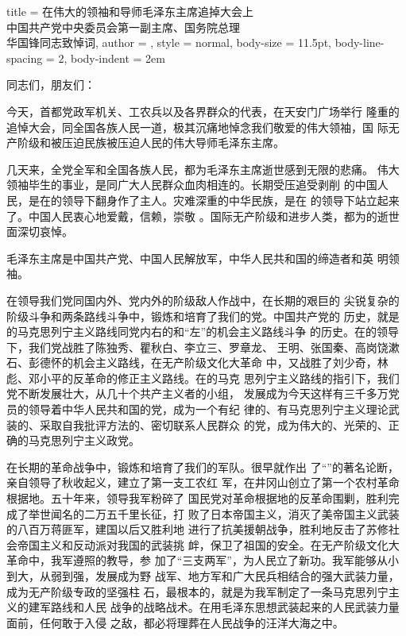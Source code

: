 \begin{hongqiarticle}{
    title  = {在伟大的领袖和导师毛泽东主席追掉大会上\\
        中国共产党中央委员会第一副主席、国务院总理\\
        华国锋同志致悼词},
    author = {},
    style  = normal,
    body-size = 11.5pt,
    body-line-spacing = 2,
    body-indent = 2em
  }

  \noindent 同志们，朋友们：

  今天，首都党政军机关、工农兵以及各界群众的代表，在天安门广场举行
  隆重的追悼大会，同全国各族人民一道，极其沉痛地悼念我们敬爱的伟大领袖，国
  际无产阶级和被压迫民族被压迫人民的伟大导师毛泽东主席。

  几天来，全党全军和全国各族人民，都为毛泽东主席逝世感到无限的悲痛。
  伟大领袖毕生的事业，是同广大人民群众血肉相连的。长期受压追受剥削
  的中国人民，是在的领导下翻身作了主人。灾难深重的中华民族，是在
  的领导下站立起来了。中国人民衷心地爱戴，信赖，崇敬
  。国际无产阶级和进步人类，都为的逝世面深切哀悼。

  毛泽东主席是中国共产党、中国人民解放军，中华人民共和国的缔造者和英
  明领袖。

  在领导我们党同国内外、党内外的阶级敌人作战中，在长期的艰巨的
  尖锐复杂的阶级斗争和两条路线斗争中，锻炼和培育了我们的党。中国共产党的
  历史，就是的马克思列宁主义路线同党内右的和“左”的机会主义路线斗争
  的历史。在的领导下，我们党战胜了陈独秀、瞿秋白、李立三、罗章龙、
  王明、张国秦、高岗饶漱石、彭德怀的机会主义路线，在无产阶级文化大革命
  中，又战胜了刘少奇，林彪、邓小平的反革命的修正主义路线。在的马克
  思列宁主义路线的指引下，我们党不断发展壮大，从几十个共产主义者的小组，
  发展成为今天这样有三千多万党员的领导着中华人民共和国的党，成为一个有纪
  律的、有马克思列宁主义理论武装的、采取自我批评方法的、密切联系人民群众
  的党，成为伟大的、光荣的、正确的马克思列宁主义政党。

  在长期的革命战争中，锻炼和培育了我们的军队。很早就作出
  了“”的著名论断，亲自领导了秋收起义，建立了第一支工农红
  军，在井冈山创立了第一个农村革命根据地。五十年来，领导我军粉碎了
  国民党对革命根据地的反革命围剿，胜利完成了举世闻名的二万五千里长征，打
  败了日本帝国主义，消灭了美帝国主义武装的八百万蒋匪军，建国以后又胜利地
  进行了抗美援朝战争，胜利地反击了苏修社会帝国主义和反动派对我国的武装挑
  衅，保卫了祖国的安全。在无产阶级文化大革命中，我军遵照的教导，参
  加了“三支两军”，为人民立了新功。我军能够从小到大，从弱到强，发展成为野
  战军、地方军和广大民兵相结合的强大武装力量，成为无产阶级专政的坚强柱
  石，最根本的，就是为我军制定了一条马克思列宁主义的建军路线和人民
  战争的战略战术。在用毛泽东思想武装起来的人民武装力量面前，任何敢于入侵
  之敌，都必将理葬在人民战争的汪洋大海之中。


\end{hongqiarticle}
